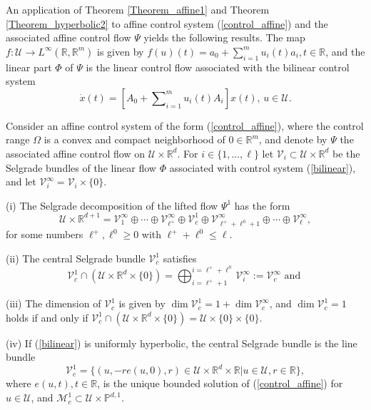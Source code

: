 	An application of Theorem \ref{Theorem_affine1} and Theorem
	\ref{Theorem_hyperbolic2} to affine control system (\ref{control_affine}) and
	the associated affine control flow $\Psi$ yields the following results. The
	map $f:\mathcal{U}\rightarrow L^{\infty}(\mathbb{R},\mathbb{R}^{m})$ is given
	by $f(u)(t)=a_{0}+\sum\nolimits_{i=1}^{m}u_{i}(t)a_{i},t\in\mathbb{R}$, and
	the linear part $\Phi$ of $\Psi$ is the linear control flow associated with
	the bilinear control system
	\begin{equation}
		\dot{x}(t)=\left[  A_{0}+\sum\nolimits_{i=1}^{m}u_{i}(t)A_{i}\right]
		x(t),\,u\in\mathcal{U}. \label{bilinear}%
	\end{equation}
	
	
	\begin{corollary}
		\label{Corollary_affine1}Consider an affine control system of the form
		(\ref{control_affine}), where the control range $\Omega$ is a convex and
		compact neighborhood of $0\in\mathbb{R}^{m}$, and denote by $\Psi$ the
		associated affine control flow on $\mathcal{U}\times\mathbb{R}^{d}$. For
		$i\in\{1,\ldots,\ell\}$ let $\mathcal{V}_{i}\subset\mathcal{U}\times
		\mathbb{R}^{d}$ be the Selgrade bundles of the linear flow $\Phi$ associated
		with control system (\ref{bilinear}), and let $\mathcal{V}_{i}^{\infty
		}=\mathcal{V}_{i}\times\{0\}$.
		
		(i) The Selgrade decomposition of the lifted flow $\Psi^{1}$ has the form
		\begin{equation}
			\mathcal{U}\times\mathbb{R}^{d+1}=\mathcal{V}_{1}^{\infty}\oplus\cdots
			\oplus\mathcal{V}_{\ell^{+}}^{\infty}\oplus\mathcal{V}_{c}^{1}\oplus
			\mathcal{V}_{\ell^{+}+\ell^{0}+1}^{\infty}\oplus\cdots\oplus\mathcal{V}_{\ell
			}^{\infty}, \label{Sel4}%
		\end{equation}
		for some numbers $\ell^{+},\ell^{0}\geq0$ with $\ell^{+}+\ell^{0}\leq\ell$.
		
		(ii) The central Selgrade bundle $\mathcal{V}_{c}^{1}$ satisfies
		\[
		\mathcal{V}_{c}^{1}\cap\left(  \mathcal{U}\times\mathbb{R}^{d}\times
		\{0\}\right)  =\bigoplus_{i=\ell^{+}+1}^{i=\ell^{+}+\ell^{0}}\mathcal{V}%
		_{i}^{\infty}:=\mathcal{V}_{c}^{\infty}\mbox{ and }
		\]
		
		
		(iii) The dimension of $\mathcal{V}_{c}^{1}$ is given by $\dim\mathcal{V}
		_{c}^{1}=1+\dim\mathcal{V}_{c}^{\infty}$, and $\dim\mathcal{V}_{c}^{1}=1$
		holds if and only if $\mathcal{V}_{c}^{1}\cap\left(  \mathcal{U}
		\times\mathbb{R}^{d}\times\{0\}\right)  =\mathcal{U}\times\{0\}\times\{0\}$.
		
		(iv) If (\ref{bilinear}) is uniformly hyperbolic, the central Selgrade bundle
		is the line bundle
		\begin{equation}
			\mathcal{V}_{c}^{1}=\{(u,-re(u,0),r)\in\mathcal{U}\times\mathbb{R}^{d}
			\times\mathbb{R}\left\vert u\in\mathcal{U},r\in\mathbb{R}\right.  \},
			\label{6.7}%
		\end{equation}
		where $e(u,t),t\in\mathbb{R}$, is the unique bounded solution of
		(\ref{control_affine}) for $u\in\mathcal{U}$, and $\mathcal{M}_{c}^{1}
		\subset\mathcal{U}\times\mathbb{P}^{d,1}$.
	\end{corollary}
	
